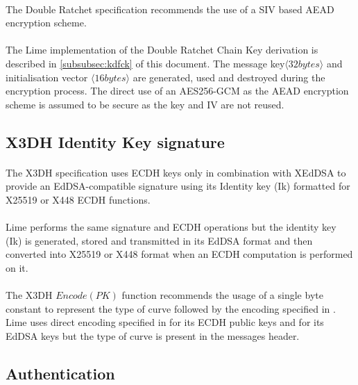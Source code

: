 \documentclass[a4paper,11pt]{article}
\begin{document}
  \paragraph{}The Double Ratchet specification \cite[section 5.2]{doubleRatchet} recommends the use of a SIV based AEAD encryption scheme.
  \paragraph{}The Lime implementation of the Double Ratchet Chain Key derivation is described in \ref{subsubsec:kdfck} of this document. The message key$\langle 32 bytes\rangle$ and initialisation vector $\langle 16 bytes\rangle $ are generated, used and destroyed during the encryption process. The direct use of an AES256-GCM as the AEAD encryption scheme is assumed to be secure as the key and IV are not reused.

  \subsection{X3DH Identity Key signature}
    \label{subsec:x3dhIk}
    \paragraph{}The X3DH specification uses ECDH keys only in combination with XEdDSA\cite{xeddsa} to provide an EdDSA-compatible signature using its Identity key (Ik) formatted for X25519 or X448 ECDH functions.
    \paragraph{}Lime performs the same signature and ECDH operations but the identity key (Ik) is generated, stored and transmitted in its EdDSA format and then converted into X25519 or X448 format when an ECDH computation is performed on it.
    \paragraph{}The X3DH $Encode(PK)$ function recommends the usage of a single byte constant to represent the type of curve followed by the encoding specified in \cite{rfc7748}. Lime uses direct encoding specified in \cite{rfc7748} for its ECDH public keys and \cite{rfc8032} for its EdDSA keys but the type of curve is present in the messages header.

  \subsection{Authentication}
\end{document}
